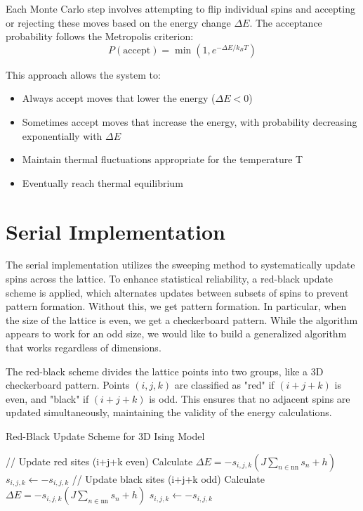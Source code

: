 \documentclass{article}
\begin{document}
Each Monte Carlo step involves attempting to flip individual spins and accepting or rejecting these moves based on the energy change $\Delta E$. The acceptance probability follows the Metropolis criterion:
\begin{equation}
P(\text{accept}) = \min(1, e^{-\Delta E/k_BT})
\end{equation}

This approach allows the system to:
\begin{itemize}
    \item Always accept moves that lower the energy ($\Delta E < 0$)
    \item Sometimes accept moves that increase the energy, with probability decreasing exponentially with $\Delta E$
    \item Maintain thermal fluctuations appropriate for the temperature T
    \item Eventually reach thermal equilibrium
\end{itemize}

\section{Serial Implementation}
The serial implementation utilizes the sweeping method to systematically update spins across the lattice. To enhance statistical reliability, a red-black update scheme is applied, which alternates updates between subsets of spins to prevent pattern formation. Without this, we get pattern formation. In particular, when the size of the lattice is even, we get a checkerboard pattern. While the algorithm appears to work for an odd size, we would like to build a generalized algorithm that works regardless of dimensions.

The red-black scheme divides the lattice points into two groups, like a 3D checkerboard pattern. Points $(i,j,k)$ are classified as "red" if $(i+j+k)$ is even, and "black" if $(i+j+k)$ is odd. This ensures that no adjacent spins are updated simultaneously, maintaining the validity of the energy calculations.

\begin{algorithm}
\caption{Red-Black Update Scheme for 3D Ising Model}
\begin{algorithmic}[1]
    \State // Update red sites (i+j+k even)
        \State Calculate $\Delta E = -s_{i,j,k}(J\sum_{n \in \text{nn}} s_n + h)$
            \State $s_{i,j,k} \gets -s_{i,j,k}$
        \EndIf
    \EndFor
    \State // Update black sites (i+j+k odd)
        \State Calculate $\Delta E = -s_{i,j,k}(J\sum_{n \in \text{nn}} s_n + h)$
            \State $s_{i,j,k} \gets -s_{i,j,k}$
        \EndIf
    \EndFor
\EndFor
\end{algorithmic}
\end{algorithm}
\end{document}
